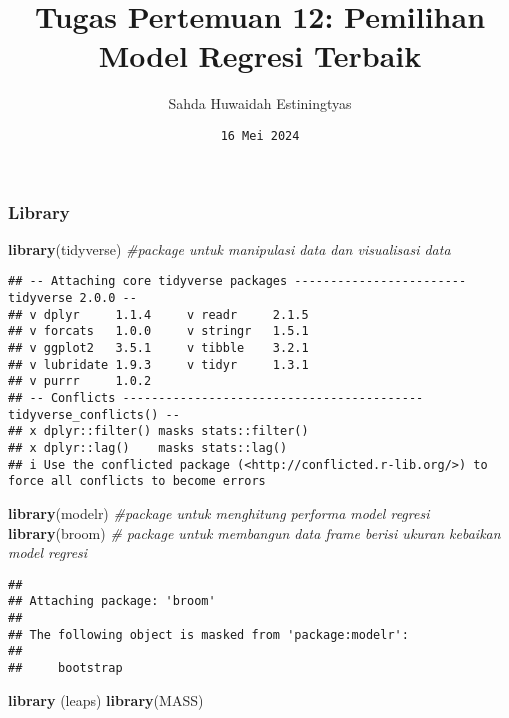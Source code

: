 \documentclass[
]{article}
\title{Tugas Pertemuan 12: Pemilihan Model Regresi Terbaik}
\author{Sahda Huwaidah Estiningtyas}
\date{\texttt{16\ Mei\ 2024}}
\newenvironment{Shaded}{\begin{snugshade}}{\end{snugshade}}
\newcommand{\CommentTok}[1]{\textcolor[rgb]{0.56,0.35,0.01}{\textit{#1}}}
\newcommand{\FunctionTok}[1]{\textcolor[rgb]{0.13,0.29,0.53}{\textbf{#1}}}
\newcommand{\NormalTok}[1]{#1}
\begin{document}
\maketitle

\subsubsection{\texorpdfstring{\textbf{Library}}{Library}}\label{library}

\begin{Shaded}
\begin{Highlighting}[]
\FunctionTok{library}\NormalTok{(tidyverse) }\CommentTok{\#package untuk manipulasi data dan visualisasi data }
\end{Highlighting}
\end{Shaded}

\begin{verbatim}
## -- Attaching core tidyverse packages ------------------------ tidyverse 2.0.0 --
## v dplyr     1.1.4     v readr     2.1.5
## v forcats   1.0.0     v stringr   1.5.1
## v ggplot2   3.5.1     v tibble    3.2.1
## v lubridate 1.9.3     v tidyr     1.3.1
## v purrr     1.0.2     
## -- Conflicts ------------------------------------------ tidyverse_conflicts() --
## x dplyr::filter() masks stats::filter()
## x dplyr::lag()    masks stats::lag()
## i Use the conflicted package (<http://conflicted.r-lib.org/>) to force all conflicts to become errors
\end{verbatim}

\begin{Shaded}
\begin{Highlighting}[]
\FunctionTok{library}\NormalTok{(modelr) }\CommentTok{\#package untuk menghitung performa model regresi}
\FunctionTok{library}\NormalTok{(broom) }\CommentTok{\# package untuk membangun data frame berisi ukuran kebaikan model regresi}
\end{Highlighting}
\end{Shaded}

\begin{verbatim}
## 
## Attaching package: 'broom'
## 
## The following object is masked from 'package:modelr':
## 
##     bootstrap
\end{verbatim}

\begin{Shaded}
\begin{Highlighting}[]
\FunctionTok{library}\NormalTok{ (leaps)}
\FunctionTok{library}\NormalTok{(MASS)}
\end{Highlighting}
\end{Shaded}
\end{document}
